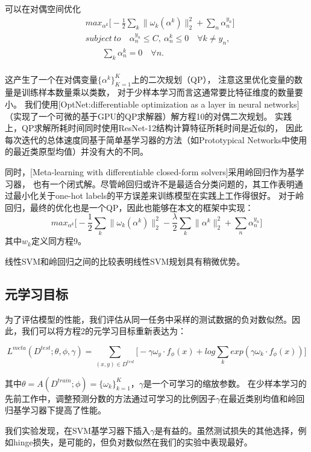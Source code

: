 可以在对偶空间优化  
\begin{equation}
    \begin{aligned}
        &max_{\alpha ^{k}} \big[ -\frac{1}{2} \sum_{k}\parallel\omega_{k}(\alpha^{k})\parallel_{2}^{2} + \sum_{n}\alpha_{n}^{y_{n}}\big]\\ 
        &subject \ to \quad \alpha_{n}^{y_{n}} \leq C, \ \alpha_{n}^{k} \leq 0 \quad \forall k \neq y_{n} , \\ 
        &\qquad \sum_{k}{\alpha_{n}^{k}=0 \quad \forall n.}\\
    \end{aligned}
\end{equation}


这产生了一个在对偶变量$\{\alpha^k\}^K_{K=1}$上的二次规划（QP），
注意这里优化变量的数量是训练样本数量乘以类数，
对于少样本学习而言这通常要比特征维度的数量要小。
我们使用[OptNet:differentiable optimization as a layer in neural networks]
（实现了一个可微的基于GPU的QP求解器）解方程10的对偶二次规划。
实践上，QP求解所耗时间同时使用ResNet-12结构计算特征所耗时间是近似的，
因此每次迭代的总体速度同基于简单基学习器的方法（如Prototypical Networks中使用的最近类原型均值）并没有大的不同。

同时，[Meta-learning with differentiable closed-form solvers]采用岭回归作为基学习器，
也有一个闭式解。尽管岭回归或许不是最适合分类问题的，其工作表明通过最小化关于one-hot labels的平方误差来训练模型在实践上工作得很好。
对于岭回归，最终的优化也是一个QP，因此也能够在本文的框架中实现：
\begin{equation}
    max_{\alpha^{k}} \big[ - \frac{1}{2} \sum_{k} \parallel\omega_{k}(\alpha^{k}) \parallel_{2}^{2} - \frac{\lambda}{2} \sum_{k}{\parallel\alpha^{k}\parallel_{2}^{2}}+\sum_{n}{\alpha_{n}^{y_{n}}} \big] 
\end{equation}
其中$w_k$定义同方程9。

线性SVM和岭回归之间的比较表明线性SVM规划具有稍微优势。

\subsection{元学习目标}

为了评估模型的性能，我们评估从同一任务中采样的测试数据的负对数似然。因此，我们可以将方程2的元学习目标重新表达为：

\begin{equation}
    L^{meta}(D^{test};\theta,\phi,\gamma)=\sum_{(x,y) \in D^{test}}{ \big[ -\gamma \omega_{y} \cdot f_{\phi}(x) + log\sum_{k}{exp(\gamma\omega_{k}\cdot f_{\phi}(x))}\big]}
\end{equation}

其中$\theta=A(D^{train};\phi)=\{\omega_{k}\}_{k=1}^{K}$，$\gamma$是一个可学习的缩放参数。
在少样本学习的先前工作中，调整预测分数的方法通过可学习的比例因子$\gamma$在最近类别均值和岭回归基学习器下提高了性能。

我们实验发现，在SVM基学习器下插入$\gamma$是有益的。虽然测试损失的其他选择，例如hinge损失，是可能的，但负对数似然在我们的实验中表现最好。
